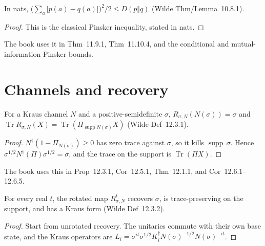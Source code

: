\begin{theorem}
  \label{thm:pinsker}
  In nats, $\bigl(\sum_a \lvert p(a)-q(a)\rvert\bigr)^2/2 \le D(p\Vert q)$
  (Wilde Thm/Lemma~10.8.1).
\end{theorem}

\begin{proof}
  This is the classical Pinsker inequality, stated in nats.
\end{proof}

The book uses it in Thm~11.9.1, Thm~11.10.4, and the conditional and
mutual-information Pinsker bounds.

\chapter{Channels and recovery}

\begin{theorem}
  \label{thm:petz_recovers}
  For a Kraus channel $N$ and a positive-semidefinite $\sigma$,
  $R_{\sigma,N}(N(\sigma))=\sigma$ and
  $\operatorname{Tr} R_{\sigma,N}(X)=\operatorname{Tr}(\Pi_{\operatorname{supp} N(\sigma)} X)$
  (Wilde Def~12.3.1).
\end{theorem}

\begin{proof}
  $N^\dagger(1-\Pi_{N(\sigma)})\ge 0$ has zero trace against $\sigma$, so it
  kills $\operatorname{supp}\,\sigma$. Hence
  $\sigma^{1/2} N^\dagger(\Pi)\sigma^{1/2}=\sigma$, and the trace on the support
  is $\operatorname{Tr}(\Pi X)$.
\end{proof}

The book uses this in Prop~12.3.1, Cor~12.5.1, Thm~12.1.1, and
Cor~12.6.1--12.6.5.

\begin{theorem}
  \label{thm:rotatedPetz_props}
  For every real $t$, the rotated map $R^t_{\sigma,N}$ recovers $\sigma$, is
  trace-preserving on the support, and has a Kraus form (Wilde Def~12.3.2).
\end{theorem}

\begin{proof}
  Start from unrotated recovery. The unitaries commute with their own base
  state, and the Kraus operators are
  $L_i = \sigma^{it}\sigma^{1/2} K_i^\dagger N(\sigma)^{-1/2} N(\sigma)^{-it}$.
\end{proof}

